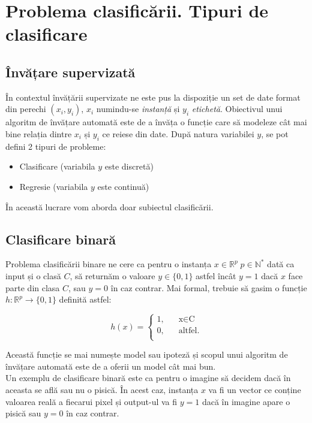 \section{Problema clasificării. Tipuri de clasificare}
\subsection{Învățare supervizată}
În contextul învățării supervizate ne este pus la dispoziție un set de date format din perechi $(x_i, y_i)$, $x_i$ numindu-se \textit{instanță} și $y_i$ \textit{etichetă}. Obiectivul unui algoritm de învățare automată este de a învăța o funcție care să modeleze cât mai bine relația dintre $x_i$ și $y_i$ ce reiese din date. După natura variabilei $y$, se pot defini 2 tipuri de probleme:

\begin{itemize}
\item Clasificare (variabila $y$ este discretă)
\item Regresie (variabila $y$ este continuă)
\end{itemize}

În această lucrare vom aborda doar subiectul clasificării.

\subsection{Clasificare binară}
Problema clasificării binare ne cere ca pentru o instanța $x\in\mathbb{R}^p \; p\in\mathbb{N^*}$  dată ca input și o clasă $C$, să returnăm o valoare $y\in\{0, 1\}$ astfel încât $y=1$ dacă $x$ face parte din clasa $C$, sau $y=0$ în caz contrar. Mai formal, trebuie să gasim o funcție $h:\mathbb{R}^p\rightarrow\{0, 1\}$ definită astfel: 

\[
h(x)=
	\begin{cases}
		\text{1,} &\quad\text{x}\in\text{C} \\
		\text{0,} &\quad\text{altfel.} \\
	\end{cases}
\]

Această funcție se mai numește model sau ipoteză și scopul unui algoritm de învățare automată este de a oferii un model cât mai bun.\\
Un exemplu de clasificare binară este ca pentru o imagine să decidem dacă în aceasta se află sau nu o pisică. În acest caz, instanța $x$ va fi un vector ce conține valoarea reală a fiecarui pixel și output-ul va fi $y=1$ dacă în imagine apare o pisică sau $y=0$ în caz contrar.


